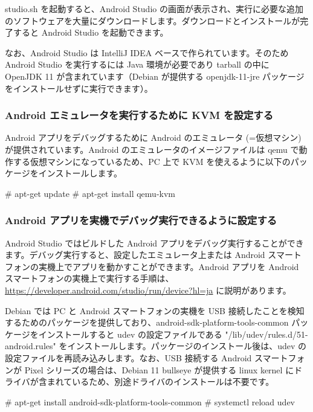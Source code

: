 \documentclass[mingoth,a4paper]{jsarticle}
\begin{document}
studio.sh を起動すると、Android Studio の画面が表示され、実行に必要な追加のソフトウェアを大量にダウンロードします。ダウンロードとインストールが完了すると Android Studio を起動できます。

なお、Android Studio は IntelliJ IDEA ベースで作られています。そのため Android Studio を実行するには Java 環境が必要であり tarball の中に OpenJDK 11 が含まれています（Debian が提供する openjdk-11-jre パッケージをインストールせずに実行できます）。


\subsubsection{Android エミュレータを実行するために KVM を設定する}

Android アプリをデバッグするために Android のエミュレータ (=仮想マシン) が提供されています。Android のエミュレータのイメージファイルは qemu で動作する仮想マシンになっているため、PC 上で KVM を使えるように以下のパッケージをインストールします。

\begin{commandline}
# apt-get update
# apt-get install qemu-kvm
\end{commandline}


\subsubsection{Android アプリを実機でデバッグ実行できるように設定する}

Android Studio ではビルドした Android アプリをデバッグ実行することができます。デバッグ実行すると、設定したエミュレータ上または Android スマートフォンの実機上でアプリを動かすことができます。Android アプリを Android スマートフォンの実機上で実行する手順は、\url{https://developer.android.com/studio/run/device?hl=ja} に説明があります。

Debian では PC と Android スマートフォンの実機を USB 接続したことを検知するためのパッケージを提供しており、android-sdk-platform-tools-common パッケージをインストールすると udev の設定ファイルである "/lib/udev/rules.d/51-android.rules" をインストールします。パッケージのインストール後は、udev の設定ファイルを再読み込みします。なお、USB 接続する Android スマートフォンが Pixel シリーズの場合は、Debian 11 bullseye が提供する linux kernel にドライバが含まれているため、別途ドライバのインストールは不要です。

\begin{commandline}
# apt-get install android-sdk-platform-tools-common
# systemctl reload udev
\end{commandline}
\end{document}
